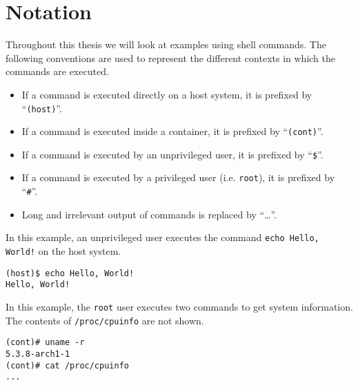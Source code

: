 \chapter{Notation}
Throughout this thesis we will look at examples using shell commands. The following conventions are used to represent the different contexts in which the commands are executed.

\begin{itemize}
    \item If a command is executed directly on a host system, it is prefixed by ``\lstinline{(host)}''.
    \item If a command is executed inside a container, it is prefixed by ``\lstinline{(cont)}''.
    \item If a command is executed by an unprivileged user, it is prefixed by ``\lstinline{$}''.
    \item If a command is executed by a privileged user (i.e. \lstinline{root}), it is prefixed by ``\lstinline{#}''.
    \item Long and irrelevant output of commands is replaced by ``\ldots''.
\end{itemize}

In this example, an unprivileged user executes the command \lstinline{echo Hello, World!} on the host system.
\begin{lstlisting}[caption={Shell command notation example 1}, captionpos=b]
(host)$ echo Hello, World!
Hello, World!
\end{lstlisting}

\hfill

In this example, the \lstinline{root} user executes two commands to get system information. The contents of \lstinline{/proc/cpuinfo} are not shown.
\begin{lstlisting}[caption={Shell command notation example 2}, captionpos=b]
(cont)# uname -r
5.3.8-arch1-1
(cont)# cat /proc/cpuinfo
...
\end{lstlisting}
